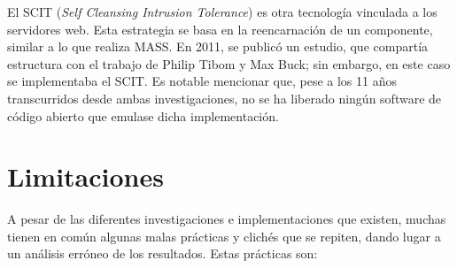 El SCIT (\textit{Self Cleansing Intrusion Tolerance})\cite{SCIT-base} es otra tecnología vinculada a los servidores web. Esta estrategia se basa en la reencarnación de un componente, similar a lo que realiza MASS. En 2011, se publicó un estudio\cite{SCIT-cloud}, que compartía estructura con el trabajo de Philip Tibom y Max Buck; sin embargo, en este caso se implementaba el SCIT. Es notable mencionar que, pese a los 11 años transcurridos desde ambas investigaciones, no se ha liberado ningún software de código abierto que emulase dicha implementación.


\section{Limitaciones}
A pesar de las diferentes investigaciones e implementaciones que existen, muchas tienen en común algunas malas prácticas y clichés que se repiten, dando lugar a un análisis erróneo de los resultados. Estas prácticas son:
